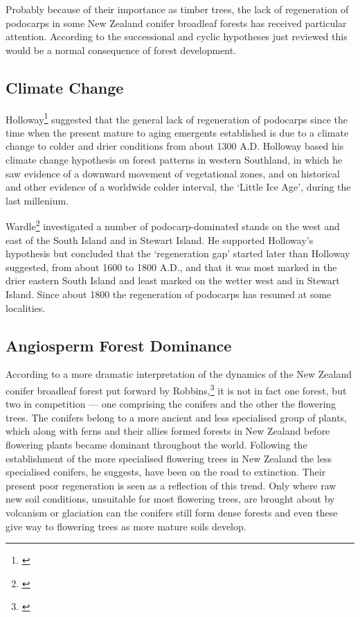 Probably because of their importance as timber trees, the lack of regeneration of podocarps in some New Zealand conifer broadleaf forests has received particular attention.
According to the successional and cyclic hypotheses just reviewed this would be a normal consequence of forest development.

\subsection{Climate Change}

Holloway\footnote{\cite{holloway1954forests}} suggested that the general lack of regeneration of podocarps since the time when the present mature to aging emergents established is due to a climate change to colder and drier conditions from about 1300 A.D.
Holloway based his climate change hypothesis on forest patterns in western Southland, in which he saw evidence of a downward movement of vegetational zones, and on historical and other evidence of a worldwide colder interval, the `Little Ice Age', during the last millenium.

Wardle\footnote{\cite{wardle1963regeneration}} investigated a number of podocarp-dominated stands on the west and east of the South Island and in Stewart Island.
He supported Holloway's hypothesis but concluded that the `regeneration gap' started later than Holloway suggested, from about 1600 to 1800 A.D., and that it was most marked in the drier eastern South Island and least marked on the wetter west and in Stewart Island.
Since about 1800 the regeneration of podocarps has resumed at some localities.

\subsection{Angiosperm Forest Dominance}

According to a more dramatic interpretation of the dynamics of the New Zealand conifer broadleaf forest put forward by Robbins,\footnote{\cite{robbins1962podocarp}} it is not in fact one forest, but two in competition --- one comprising the conifers and the other the flowering trees.
The conifers belong to a more ancient and less specialised group of plants, which along with ferns and their allies formed forests in New Zealand before flowering plants became dominant throughout the world.
Following the establishment of the more specialised flowering trees in New Zealand the less specialised conifers, he suggests, have been on the road to extinction.
Their present poor regeneration is seen as a reflection of this trend.
Only where raw new soil conditions, unsuitable for most flowering trees, are brought about by volcanism or glaciation can the conifers still form dense forests and even these give way to flowering trees as more mature soils develop.

